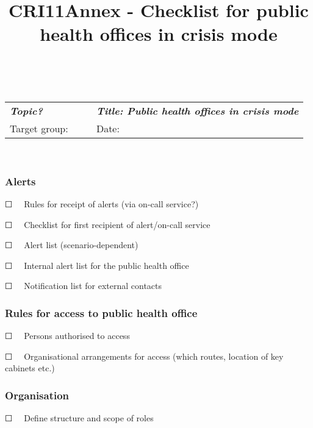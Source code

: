 \documentclass{article}
\begin{document}
\title{CRI11Annex - Checklist for public health offices in crisis mode}

\maketitle


 


\begin{tabu} to \textwidth { |X|X|X| }
\hline



\emph{\textbf{Topic?}}        &  & \emph{\textbf{Title: Public health offices in crisis mode}}
 \\


Target group:  &  & Date:
 \\
\hline

\end{tabu}

                    


\subsubsection{Alerts}\label{H1727143}



☐   Rules for receipt of alerts (via on-call service?)


☐   Checklist for first recipient of alert/on-call service


☐   Alert list (scenario-dependent)


☐   Internal alert list for the public health office


☐   Notification list for external contacts 


\subsubsection{Rules for access to public health office}\label{H368347}



☐   Persons authorised to access


☐   Organisational arrangements for access (which routes, location of key cabinets etc.)


\subsubsection{Organisation}\label{H6256762}



☐   Define structure and scope of roles
\end{document}
